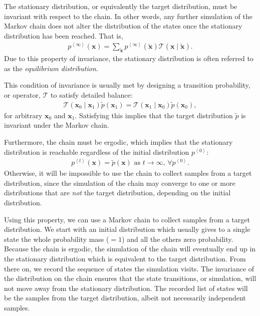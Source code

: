 \documentclass[dissertation,nocontribution]{aaltoseries}
\newcommand{\qt}[1]{\left<#1\right>}
\newcommand{\vect}[1]{\mathbf{#1}}
\newcommand{\vx}[0]{\vect{x}}
\newcommand{\T}[0]{\mathcal{T}}
\begin{document}
The stationary distribution, or equivalently the target
distribution, must be invariant with respect to the chain.
In other words, any further simulation of the Markov chain
does not alter the distribution of the states once the
stationary distribution has been reached. That is,
\begin{align*}
    p^{\qt{\infty}}(\vx) = \sum_{\tilde{\vx}}
    p^{\qt{\infty}}(\tilde{\vx}) \T(\vx \mid \tilde{\vx}).
\end{align*}
Due to this property of invariance, the stationary
distribution is often referred to as the \textit{equilibrium
distribution}.

This condition of invariance is usually met by designing a
transition probability, or operator, $\T$ to satisfy 
detailed balance:
\begin{align*}
    \T(\vx_0 \mid \vx_1)\tilde{p}(\vx_1) = \T(\vx_1 \mid
    \vx_0)\tilde{p}(\vx_0),
\end{align*}
for arbitrary $\vx_{0}$ and $\vx_{1}$.  Satisfying this
implies that the target distribution $\tilde{p}$ is
invariant under the Markov chain.

Furthermore, the chain must be ergodic, which implies that
the stationary distribution is reachable
regardless of the initial distribution $p^{\qt{0}}$:
\begin{align}
    \label{eq:mcmc_ergodic}
    p^{\qt{t}}(\vx) = \tilde{p}(\vx)\text{ as }t \to
    \infty\text{, }\forall p^{\qt{0}}.
\end{align}
Otherwise, it will be impossible to use the chain to
collect samples from a target distribution, since the
simulation of the chain may converge to one or more
distributions that are \textit{not} the target distribution,
depending on the initial distribution.

Using this property, we can use a Markov chain to collect
samples from a target distribution. We start with an initial
distribution which usually gives to a single state the whole
probability mass ($=1$) and all the others zero probability. Because the
chain is ergodic, the simulation of the chain will
eventually end up in the stationary distribution which is
equivalent to the target distribution. From there on, we
record the sequence of states the simulation visits. The
invariance of the distribution on the chain ensures that the
state transitions, or simulation, will not move away from
the stationary distribution. The recorded list of states
will be the samples from the target distribution, albeit not
necessarily independent samples.
\end{document}
